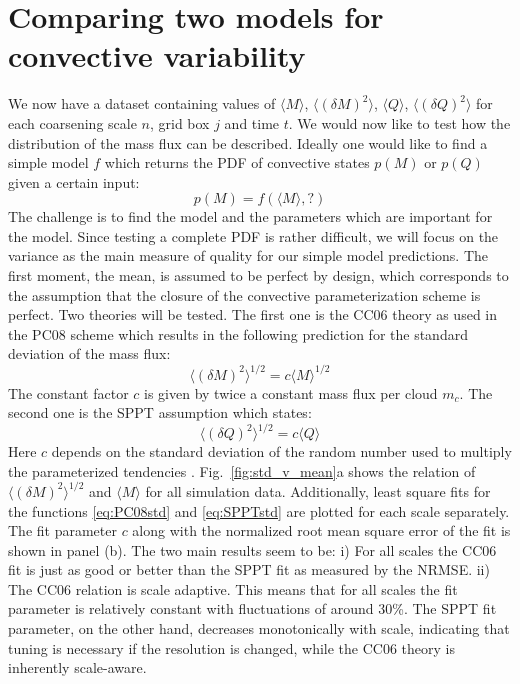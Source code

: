 \documentclass[a4paper, 12pt]{article}
\begin{document}
\section{Comparing two models for convective variability}
We now have a dataset containing values of $\langle M \rangle$, $\langle (\delta M )^2 \rangle$, $\langle Q \rangle$, $\langle (\delta Q )^2 \rangle$ for each coarsening scale $n$, grid box $j$ and time $t$. We would now like to test how the distribution of the mass flux can be described. Ideally one would like to find a simple model $f$ which returns the PDF of convective states $p(M)$ or $p(Q)$ given a certain input:
\begin{equation}
 p(M) = f(\langle M \rangle, ?)
\end{equation}
The challenge is to find the model and the parameters which are important for the model. Since testing a complete PDF is rather difficult, we will focus on the variance as the main measure of quality for our simple model predictions. The first moment, the mean, is assumed to be perfect by design, which corresponds to the assumption that the closure of the convective parameterization scheme is perfect. Two theories will be tested. The first one is the CC06 theory as used in the PC08 scheme which results in the following prediction for the standard deviation of the mass flux:
\begin{equation} \label{eq:PC08std}
 \langle (\delta M)^2 \rangle^{1/2} = c \langle M \rangle^{1/2}
\end{equation}
The constant factor $c$ is given by twice a constant mass flux per cloud $m_c$.
The second one is the SPPT assumption which states:
\begin{equation}\label{eq:SPPTstd}
 \langle (\delta Q)^2 \rangle^{1/2} = c \langle Q \rangle
\end{equation}
Here $c$ depends on the standard deviation of the random number used to multiply the parameterized tendencies \citep{Shutts2007}. 
Fig.~\ref{fig:std_v_mean}a shows the relation of $\langle (\delta M)^2 \rangle^{1/2}$ and $\langle M \rangle$ for all simulation data. Additionally, least square fits for the functions \ref{eq:PC08std} and \ref{eq:SPPTstd} are plotted for each scale separately. The fit parameter $c$ along with the normalized root mean square error of the fit is shown in panel (b). The two main results seem to be: i) For all scales the CC06 fit is just as good or better than the SPPT fit as measured by the NRMSE. ii) The CC06 relation is scale adaptive. This means that for all scales the fit parameter is relatively constant with fluctuations of around 30\%. The SPPT fit parameter, on the other hand, decreases monotonically with scale, indicating that tuning is necessary if the resolution is changed, while the CC06 theory is inherently scale-aware. 
\end{document}
